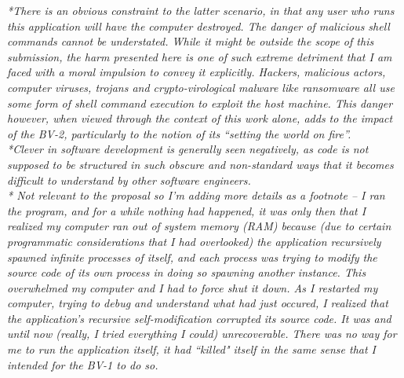 \documentclass[11pt]{article}
\begin{document}
\textit{*There is an obvious constraint to the latter scenario, in that any user who runs this application will have the computer destroyed. The danger of malicious shell commands cannot be understated. While it might be outside the scope of this submission, the harm presented here is one of such extreme detriment that I am faced with a moral impulsion to convey it explicitly. Hackers, malicious actors, computer viruses, trojans and crypto-virological malware like ransomware all use some form of shell command execution to exploit the host machine. This danger however, when viewed through the context of this work alone, adds to the impact of the BV-2, particularly to the notion of its “setting the world on fire”.} \\

\textit{*Clever in software development is generally seen negatively, as code is not supposed to be structured in such obscure and non-standard ways that it becomes difficult to understand by other software engineers.} \\


\textit{* Not relevant to the proposal so I'm adding more details as a footnote – I ran the program, and for a while nothing had happened, it was only then that I realized my computer ran out of system memory (RAM) because (due to certain programmatic considerations that I had overlooked) the application recursively spawned infinite processes of itself, and each process was trying to modify the source code of its own process in doing so spawning another instance. This overwhelmed my computer and I had to force shut it down. As I restarted my computer, trying to debug and understand what had just occured, I realized that the application's recursive self-modification corrupted its source code. It was and until now (really, I tried everything I could) unrecoverable. There was no way for me to run the application itself, it had ``killed" itself in the same sense that I intended for the BV-1 to do so.}
\end{document}
